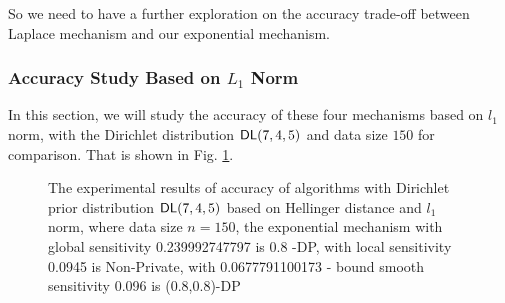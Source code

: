 So we need to have a further exploration on the accuracy trade-off between Laplace mechanism and our exponential mechanism.

\subsubsection{Accuracy Study Based on $L_1$ Norm}
\label{subsec_accuracy_l1}
In this section, we will study the accuracy of these four mechanisms based on $l_1$ norm, with the Dirichlet distribution $\mathsf{DL}(7,4,5)$ and data size $150$ for comparison. That is shown in Fig. \ref{fig_dirichlet_hellinger_l1}.

\begin{figure}
\begin{center}
\centering
\caption{The experimental results of accuracy of algorithms with Dirichlet prior distribution $\mathsf{DL}(7, 4, 5)$ based on Hellinger distance and $l_1$  norm, where data size $n = 150$, the exponential mechanism with global sensitivity 0.239992747797 is 0.8 -DP, with local sensitivity 0.0945 is Non-Private, with 0.0677791100173 - bound smooth sensitivity 0.096 is (0.8,0.8)-DP}
\label{fig_dirichlet_hellinger_l1}
\end{center}
\end{figure}

